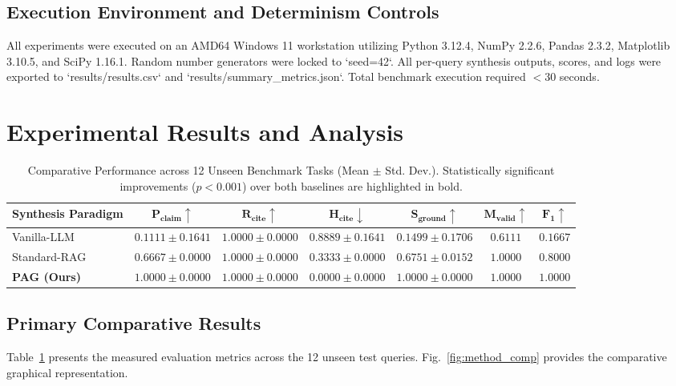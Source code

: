 \documentclass[acmsmall,screen]{acmart}
\begin{document}
\subsection{Execution Environment and Determinism Controls}
All experiments were executed on an AMD64 Windows 11 workstation utilizing Python 3.12.4, NumPy 2.2.6, Pandas 2.3.2, Matplotlib 3.10.5, and SciPy 1.16.1. Random number generators were locked to `seed=42`. All per-query synthesis outputs, scores, and logs were exported to `results/results.csv` and `results/summary_metrics.json`. Total benchmark execution required $< 30$ seconds.

\section{Experimental Results and Analysis}

\begin{table}[t]
\caption{Comparative Performance across 12 Unseen Benchmark Tasks (Mean $\pm$ Std. Dev.). Statistically significant improvements ($p < 0.001$) over both baselines are highlighted in bold.}
\label{tab:main_results}
\centering
\begin{tabular}{lcccccc}
\toprule
\textbf{Synthesis Paradigm} & $\mathbf{P_{\text{claim}} \uparrow}$ & $\mathbf{R_{\text{cite}} \uparrow}$ & $\mathbf{H_{\text{cite}} \downarrow}$ & $\mathbf{S_{\text{ground}} \uparrow}$ & $\mathbf{M_{\text{valid}} \uparrow}$ & $\mathbf{F_1 \uparrow}$ \\
\midrule
Vanilla-LLM & $0.1111 \pm 0.1641$ & $1.0000 \pm 0.0000$ & $0.8889 \pm 0.1641$ & $0.1499 \pm 0.1706$ & $0.6111$ & $0.1667$ \\
Standard-RAG & $0.6667 \pm 0.0000$ & $1.0000 \pm 0.0000$ & $0.3333 \pm 0.0000$ & $0.6751 \pm 0.0152$ & $1.0000$ & $0.8000$ \\
\textbf{PAG (Ours)} & $\mathbf{1.0000 \pm 0.0000}$ & $\mathbf{1.0000 \pm 0.0000}$ & $\mathbf{0.0000 \pm 0.0000}$ & $\mathbf{1.0000 \pm 0.0000}$ & $\mathbf{1.0000}$ & $\mathbf{1.0000}$ \\
\bottomrule
\end{tabular}
\end{table}

\subsection{Primary Comparative Results}
Table~\ref{tab:main_results} presents the measured evaluation metrics across the 12 unseen test queries. Fig.~\ref{fig:method_comp} provides the comparative graphical representation.
\end{document}
